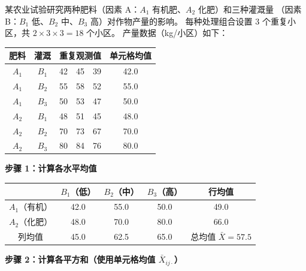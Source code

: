 \begin{example}
某农业试验研究两种肥料（因素 A：$A_1$ 有机肥、$A_2$ 化肥）和三种灌溉量
（因素 B：$B_1$ 低、$B_2$ 中、$B_3$ 高）对作物产量的影响。
每种处理组合设置 3 个重复小区，共 $2 \times 3 \times 3 = 18$ 个小区。
产量数据（kg/小区）如下：

\begin{center}
\begin{tabular}{cc|ccc|c}
    \toprule
    肥料 & 灌溉 & \multicolumn{3}{c|}{重复观测值} & 单元格均值 \\
    \midrule
    $A_1$ & $B_1$ & 42 & 45 & 39 & 42.0 \\
    $A_1$ & $B_2$ & 55 & 58 & 52 & 55.0 \\
    $A_1$ & $B_3$ & 50 & 53 & 47 & 50.0 \\
    \midrule
    $A_2$ & $B_1$ & 48 & 51 & 45 & 48.0 \\
    $A_2$ & $B_2$ & 70 & 73 & 67 & 70.0 \\
    $A_2$ & $B_3$ & 80 & 84 & 76 & 80.0 \\
    \bottomrule
\end{tabular}
\end{center}

\textbf{步骤 1：计算各水平均值}

\begin{center}
\begin{tabular}{c|ccc|c}
    \toprule
    & $B_1$（低） & $B_2$（中） & $B_3$（高） & 行均值 \\
    \midrule
    $A_1$（有机） & 42.0 & 55.0 & 50.0 & 49.0 \\
    $A_2$（化肥） & 48.0 & 70.0 & 80.0 & 66.0 \\
    \midrule
    列均值 & 45.0 & 62.5 & 65.0 & 总均值 $\bar{X} = 57.5$ \\
    \bottomrule
\end{tabular}
\end{center}

\textbf{步骤 2：计算各平方和（使用单元格均值 $\bar{X}_{ij\cdot}$）}


\end{example}
